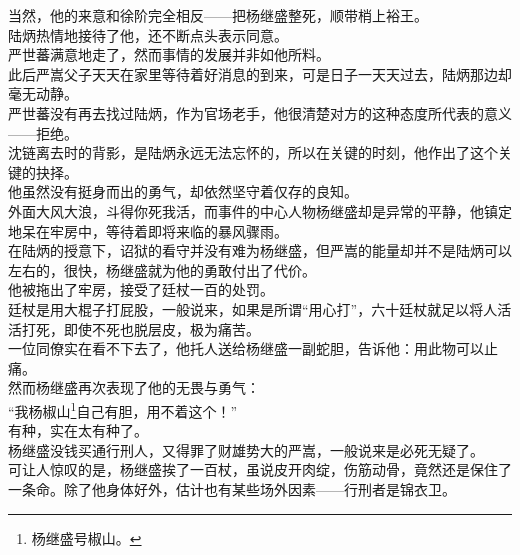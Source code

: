 \begin{multicols}{\theparacolNo}
当然，他的来意和徐阶完全相反——把杨继盛整死，顺带梢上裕王。\\

陆炳热情地接待了他，还不断点头表示同意。\\

严世蕃满意地走了，然而事情的发展并非如他所料。\\

此后严嵩父子天天在家里等待着好消息的到来，可是日子一天天过去，陆炳那边却毫无动静。\\

严世蕃没有再去找过陆炳，作为官场老手，他很清楚对方的这种态度所代表的意义——拒绝。\\

沈链离去时的背影，是陆炳永远无法忘怀的，所以在关键的时刻，他作出了这个关键的抉择。\\

他虽然没有挺身而出的勇气，却依然坚守着仅存的良知。\\

外面大风大浪，斗得你死我活，而事件的中心人物杨继盛却是异常的平静，他镇定地呆在牢房中，等待着即将来临的暴风骤雨。\\

在陆炳的授意下，诏狱的看守并没有难为杨继盛，但严嵩的能量却并不是陆炳可以左右的，很快，杨继盛就为他的勇敢付出了代价。\\

他被拖出了牢房，接受了廷杖一百的处罚。\\

廷杖是用大棍子打屁股，一般说来，如果是所谓“用心打”，六十廷杖就足以将人活活打死，即使不死也脱层皮，极为痛苦。\\

一位同僚实在看不下去了，他托人送给杨继盛一副蛇胆，告诉他：用此物可以止痛。\\

然而杨继盛再次表现了他的无畏与勇气：\\

“我杨椒山\footnote{杨继盛号椒山。}自己有胆，用不着这个！”\\

有种，实在太有种了。\\

杨继盛没钱买通行刑人，又得罪了财雄势大的严嵩，一般说来是必死无疑了。\\

可让人惊叹的是，杨继盛挨了一百杖，虽说皮开肉绽，伤筋动骨，竟然还是保住了一条命。除了他身体好外，估计也有某些场外因素——行刑者是锦衣卫。\\


\end{multicols}
